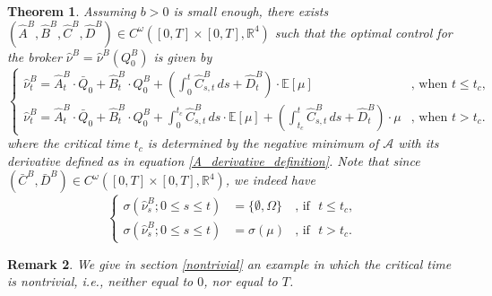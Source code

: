 \documentclass[10pt]{article}
\newtheorem{theorem}{Theorem}[section]
\newtheorem{remark}[theorem]{Remark}
\begin{document}
\begin{theorem}\label{best_control_for_broker}
    Assuming $b>0$ is small enough, there exists $(\hat{A}^B, \hat{B}^B, \hat{C}^B, \hat{D}^B) \in C^{\omega}([0,T] \times [0,T], \mathbb{R}^4)$ such that the optimal control for the broker $\hat{\nu}^B = \hat{\nu}^B(Q_0^B)$ is given by 
    \begin{equation}\label{hatnuB_solution}
        \left\{
        \begin{array}{ll}
            \hat{\nu}^B_t = \hat{A}^B_t \cdot \bar{Q}_0 + \hat{B}^B_t \cdot Q_0^B + \left(\int_0^t \hat{C}^B_{s,t} \, ds + \hat{D}^B_t \right) \cdot \mathbb{E}[\mu] & \text{, when~} t \leq t_c, \\
            \hat{\nu}^B_t = \hat{A}^B_t \cdot \bar{Q}_0 + \hat{B}^B_t \cdot Q_0^B + \int_0^{t_c} \hat{C}^B_{s,t} \, ds \cdot \mathbb{E}[\mu] + \left( \int_{t_c}^t \hat{C}^B_{s,t} \, ds + \hat{D}^B_t \right) \cdot \mu & \text{, when~} t > t_c.
        \end{array}
        \right.
    \end{equation}
    where the critical time $t_c$ is determined by the negative minimum of $\mathcal{A}$ with its derivative defined as in equation \eqref{A_derivative_definition}.
    Note that since $(\bar{C}^B, \bar{D}^B) \in C^{\omega}([0,T] \times [0,T], \mathbb{R}^4)$, we indeed have
    \begin{equation*}
        \left\{
        \begin{array}{lll}
            \sigma(\hat{\nu}^B_s; 0 \leq s \leq t) &= \{\emptyset,\Omega\} & \text{, if~~} t \leq t_c, \\ 
            \sigma(\hat{\nu}^B_s; 0 \leq s \leq t) &= \sigma(\mu) & \text{, if~~} t > t_c.
        \end{array}
        \right.
    \end{equation*}
\end{theorem}

\begin{remark}
    We give in section \ref{nontrivial} an example in which the critical time is nontrivial, i.e., neither equal to $0$, nor equal to $T$.
\end{remark}
\end{document}
